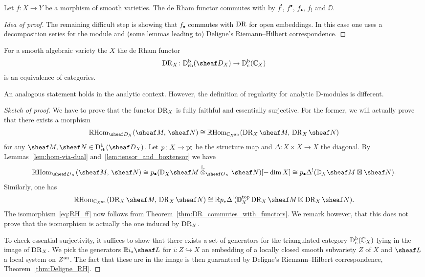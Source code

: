 \documentclass[number-in-sections,a4paper]{notes}
\begin{document}
\begin{Theorem}\label{thm:DR_commutes_with_functors}
    Let $f\colon X \to Y$ be a morphism of smooth varieties.
    The de Rham functor commutes with by $f^!$, $f^\bullet$, $f_\bullet$, $f_!$ and $\DD$.
\end{Theorem}

\begin{proof}[Idea of proof]
    The remaining difficult step is showing that $f_\bullet$ commutes with $\operatorname{DR}$ for open embeddings.
    In this case one uses a decomposition series for the module and (some lemmas leading to) Deligne's Riemann--Hilbert correspondence.
\end{proof}

\begin{Theorem}
    For a smooth algebraic variety the $X$ the de Rham functor
    \[
        \DR_X\colon \catDbDModrh{X} \to \catDbConstr{X}
    \]
    is an equivalence of categories.
\end{Theorem}

\begin{Remark}
    An analogous statement holds in the analytic context.
    However, the definition of regularity for analytic D-modules is different.
\end{Remark}

\begin{proof}[Sketch of proof]
    We have to prove that the functor $\operatorname{DR}_X$ is fully faithful and essentially surjective.
    For the former, we will actually prove that there exists a morphism
    \begin{equation}\label{eq:RH_ff}
        \RHom_{\sD_X}(\sheaf M,\, \sheaf N) \cong \RHom_{\CC_{X^\an}}(\DR_X \sheaf M,\, \DR_X \sheaf N)
    \end{equation}
    for any $\sheaf M, \sheaf N \in \catDbDModrh{X}$.
    Let $p\colon X \to \mathrm{pt}$ be the structure map and $\Delta\colon X \times X \to X$ the diagonal.
    By Lemmas~\ref{lem:hom-via-dual} and~\ref{lem:tensor_and_boxtensor} we have
    \[
        \RHom_{\sD_X}(\sheaf M,\, \sheaf N) \cong
        p_\bullet(\DD_X \sheaf M \Lotimes_{\sO_X} \sheaf N)[-\dim X] \cong
        p_\bullet\Delta^!(\DD_X \sheaf M \boxtimes \sheaf N).
    \]
    Similarly, one has
    \[
        \RHom_{\CC_{X^\an}}(\DR_X\sheaf M,\, \DR_X\sheaf N) \cong
        \RR p_* \Delta^! (\topDD_X \DR_X\sheaf M \boxtimes \DR_X\sheaf N).
    \]
    The isomorphism~\eqref{eq:RH_ff} now follows from Theorem~\ref{thm:DR_commutes_with_functors}.
    We remark however, that this does not prove that the isomorphism is actually the one induced by $\operatorname{DR}_X$.

    To check essential surjectivity, it suffices to show that there exists a set of generators for the triangulated category $\mathrm{D}^{\mathrm{b}}_{\mathrm{c}}({\mathbb{C}}_{X})$ lying in the image of $\operatorname{DR}_X$.
    We pick the generators $\RR i_*\sheaf L$ for $i\colon Z \hookrightarrow X$ an embedding of a locally closed smooth subvariety $Z$ of $X$ and $\sheaf L$ a local system on $Z^{\mathrm{an}}$.
    The fact that these are in the image is then guaranteed by Deligne's Riemann--Hilbert correspondence, Theorem~\ref{thm:Deligne_RH}.
\end{proof}
\end{document}
